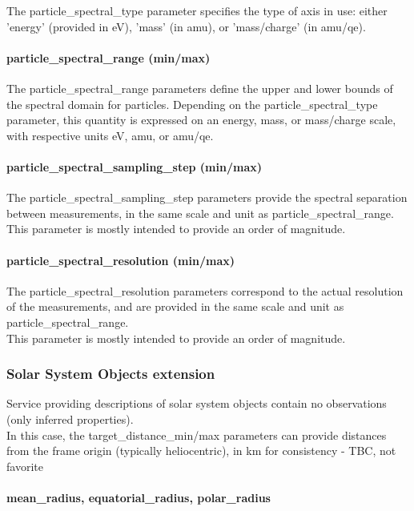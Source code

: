 \documentclass[11pt,a4paper]{ivoa}
\begin{document}
The particle\_spectral\_type parameter specifies the type of axis in use: either 'energy' (provided in eV), 'mass' (in amu), or 'mass/charge' (in amu/qe).

\paragraph{particle\_spectral\_range (min/max)}

The particle\_spectral\_range parameters define the upper and lower bounds of the spectral domain for particles. Depending on the particle\_spectral\_type parameter, this quantity is expressed on an energy, mass, or mass/charge scale, with respective units eV, amu, or amu/qe.

\paragraph{particle\_spectral\_sampling\_step (min/max)}

The particle\_spectral\_sampling\_step parameters provide the spectral separation between measurements, in the same scale and unit as particle\_spectral\_range.\\This parameter is mostly intended to provide an order of magnitude.

\paragraph{particle\_spectral\_resolution (min/max)}

The particle\_spectral\_resolution parameters correspond to the actual resolution of the measurements, and are provided in the same scale and unit as particle\_spectral\_range. \\This parameter is mostly intended to provide an order of magnitude.

\subsubsection{Solar System Objects extension}

Service providing descriptions of solar system objects contain no observations (only inferred properties).\\In this case, the target\_distance\_min/max parameters can provide distances from the frame origin (typically heliocentric), in km for consistency - TBC, not favorite

\paragraph{mean\_radius, equatorial\_radius, polar\_radius}
\end{document}
